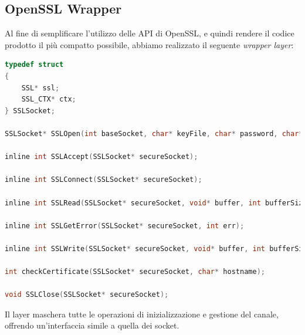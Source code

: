 \documentclass[10pt]{article}  %
\begin{document}
    \subsection{OpenSSL Wrapper}
    Al fine di semplificare l'utilizzo delle API di OpenSSL, e quindi rendere il codice prodotto
    il più compatto possibile, abbiamo realizzato il seguente \emph{wrapper layer}:
        \begin{lstlisting}[language=C]
typedef struct
{
    SSL* ssl;
    SSL_CTX* ctx;
} SSLSocket;

SSLSocket* SSLOpen(int baseSocket, char* keyFile, char* password, char* caFile);

inline int SSLAccept(SSLSocket* secureSocket);

inline int SSLConnect(SSLSocket* secureSocket);

inline int SSLRead(SSLSocket* secureSocket, void* buffer, int bufferSize);

inline int SSLGetError(SSLSocket* secureSocket, int err);

inline int SSLWrite(SSLSocket* secureSocket, void* buffer, int bufferSize);

int checkCertificate(SSLSocket* secureSocket, char* hostname);

void SSLClose(SSLSocket* secureSocket);
        \end{lstlisting}
        Il layer maschera tutte le operazioni di inizializzazione e gestione del canale,
        offrendo un'interfaccia simile a quella dei socket.
\end{document}

